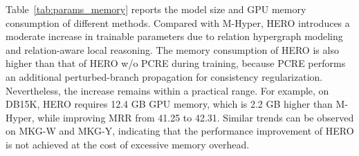 \documentclass[pdflatex,sn-mathphys-num]{sn-jnl}
\begin{document}
Table~\ref{tab:params_memory} reports the model size and GPU memory consumption of different methods. Compared with M-Hyper, HERO introduces a moderate increase in trainable parameters due to relation hypergraph modeling and relation-aware local reasoning. The memory consumption of HERO is also higher than that of HERO w/o PCRE during training, because PCRE performs an additional perturbed-branch propagation for consistency regularization. Nevertheless, the increase remains within a practical range. For example, on DB15K, HERO requires 12.4 GB GPU memory, which is 2.2 GB higher than M-Hyper, while improving MRR from 41.25 to 42.31. Similar trends can be observed on MKG-W and MKG-Y, indicating that the performance improvement of HERO is not achieved at the cost of excessive memory overhead.

\begin{table}[t]
\centering
\caption{Training and inference efficiency comparison. Training time denotes the average time per epoch, and inference time denotes the average time for evaluating the test set.}
\label{tab:runtime}
\end{table}
\end{document}
